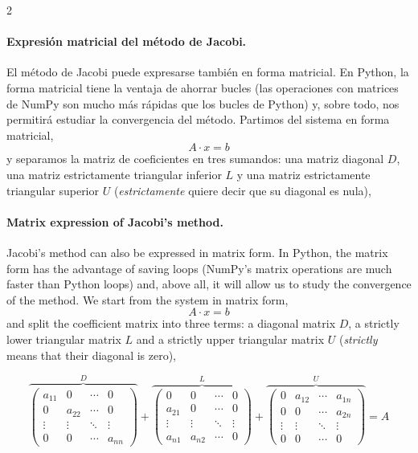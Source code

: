 \begin{paracol}{2}

\paragraph{Expresión matricial del método de Jacobi.}  El método de Jacobi puede expresarse también en forma matricial. En Python, la forma matricial tiene la ventaja de ahorrar bucles (las operaciones con matrices de NumPy son mucho más rápidas que los bucles de Python) y, sobre todo, nos permitirá estudiar la convergencia del método. Partimos del sistema en forma matricial,
\begin{equation*}
A\cdot x = b
\end{equation*}
y separamos la matriz de coeficientes en tres sumandos: una matriz diagonal $D$, una matriz estrictamente triangular inferior $L$ y una matriz estrictamente triangular superior $U$ (\emph{estrictamente} quiere decir que su diagonal es nula),

\switchcolumn

\paragraph{Matrix expression of Jacobi's method.}  Jacobi's method can also be expressed in matrix form. In Python, the matrix form has the advantage of saving loops (NumPy's matrix operations are much faster than Python loops) and, above all, it will allow us to study the convergence of the method. We start from the system in matrix form,
\begin{equation*}
A\cdot x = b
\end{equation*}
and split the coefficient matrix into three terms: a diagonal matrix $D$, a strictly lower triangular matrix $L$ and a strictly upper triangular matrix $U$ (\emph{strictly} means that their diagonal is zero),
\end{paracol}

\begin{equation*}
\overbrace{\begin{pmatrix}
a_{11}& 0& \cdots & 0\\
0& a_{22}& \cdots & 0\\
\vdots & \vdots & \ddots & \vdots\\
0& 0& \cdots & a_{nn}
\end{pmatrix}}^D+
\overbrace{\begin{pmatrix}
0& 0& \cdots & 0\\
a_{21}& 0& \cdots & 0\\
\vdots & \vdots & \ddots & \vdots\\
a_{n1}& a_{n2}& \cdots & 0
\end{pmatrix}}^L+
\overbrace{\begin{pmatrix}
0& a_{12}& \cdots & a_{1n}\\
0& 0& \cdots & a_{2n}\\
\vdots & \vdots & \ddots & \vdots\\
0& 0& \cdots & 0
\end{pmatrix}}^U = A
\end{equation*}

